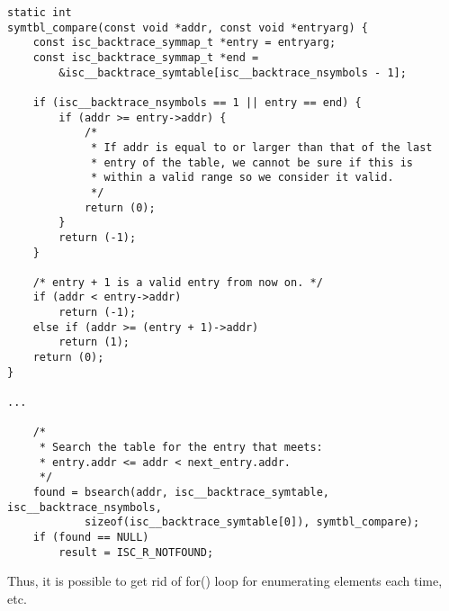 \begin{lstlisting}[caption=backtrace.c]
static int
symtbl_compare(const void *addr, const void *entryarg) {
	const isc_backtrace_symmap_t *entry = entryarg;
	const isc_backtrace_symmap_t *end =
		&isc__backtrace_symtable[isc__backtrace_nsymbols - 1];

	if (isc__backtrace_nsymbols == 1 || entry == end) {
		if (addr >= entry->addr) {
			/*
			 * If addr is equal to or larger than that of the last
			 * entry of the table, we cannot be sure if this is
			 * within a valid range so we consider it valid.
			 */
			return (0);
		}
		return (-1);
	}

	/* entry + 1 is a valid entry from now on. */
	if (addr < entry->addr)
		return (-1);
	else if (addr >= (entry + 1)->addr)
		return (1);
	return (0);
}

...

	/*
	 * Search the table for the entry that meets:
	 * entry.addr <= addr < next_entry.addr.
	 */
	found = bsearch(addr, isc__backtrace_symtable, isc__backtrace_nsymbols,
			sizeof(isc__backtrace_symtable[0]), symtbl_compare);
	if (found == NULL)
		result = ISC_R_NOTFOUND;
\end{lstlisting}

{Thus, it is possible to get rid of for() loop for enumerating elements each time, etc}.

